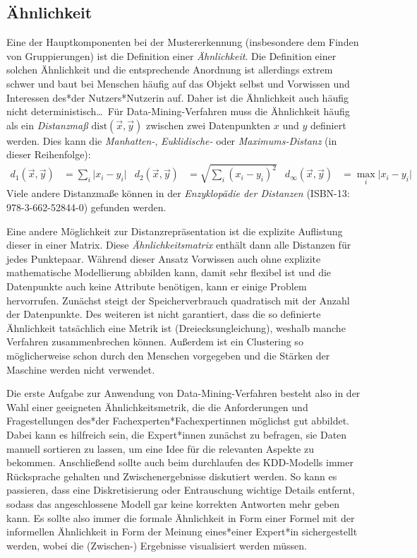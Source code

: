 		\subsection{Ähnlichkeit}
			Eine der Hauptkomponenten bei der Mustererkennung (insbesondere dem Finden von Gruppierungen) ist die Definition einer \emph{Ähnlichkeit}. Die Definition einer solchen Ähnlichkeit und die entsprechende Anordnung ist allerdings extrem schwer und baut bei Menschen häufig auf das Objekt selbst und Vorwissen und Interessen des*der Nutzers*Nutzerin auf. Daher ist die Ähnlichkeit auch häufig nicht deterministisch\dots~Für Data-Mining-Verfahren muss die Ähnlichkeit häufig als ein \emph{Distanzmaß} \( \mathrm{dist}(\vec{x}, \vec{y}) \) zwischen zwei Datenpunkten \(x\) und \(y\) definiert werden. Dies kann \zB die \emph{Manhatten-}, \emph{Euklidische-} oder \emph{Maximums-Distanz} (in dieser Reihenfolge):
			\begin{align}
				d_1(\vec{x}, \vec{y})      & = \sum_i \lvert x_i - y_i \rvert &
				d_2(\vec{x}, \vec{y})      & = \sqrt{\sum_i (x_i - y_i)^2}    &
				d_\infty(\vec{x}, \vec{y}) & = \max_i \lvert x_i - y_i \rvert
			\end{align}
			Viele andere Distanzmaße können in der \emph{Enzyklopädie der Distanzen} (ISBN-13: 978-3-662-52844-0) gefunden werden.

			Eine andere Möglichkeit zur Distanzrepräsentation ist die explizite Auflistung dieser in einer Matrix. Diese \emph{Ähnlichkeitsmatrix} enthält dann alle Distanzen für jedes Punktepaar. Während dieser Ansatz Vorwissen auch ohne explizite mathematische Modellierung abbilden kann, damit sehr flexibel ist und die Datenpunkte auch keine Attribute benötigen, kann er einige Problem hervorrufen. Zunächst steigt der Speicherverbrauch quadratisch mit der Anzahl der Datenpunkte. Des weiteren ist nicht garantiert, dass die so definierte Ähnlichkeit tatsächlich eine Metrik ist (Dreiecksungleichung), weshalb manche Verfahren zusammenbrechen können. Außerdem ist ein Clustering so möglicherweise schon durch den Menschen vorgegeben und die Stärken der Maschine werden nicht verwendet.

			Die erste Aufgabe zur Anwendung von Data-Mining-Verfahren besteht also in der Wahl einer geeigneten Ähnlichkeitsmetrik, die die Anforderungen und Fragestellungen des*der Fachexperten*Fachexpertinnen möglichst gut abbildet. Dabei kann es hilfreich sein, die Expert*innen zunächst zu befragen, \bzw sie Daten manuell sortieren zu lassen, um eine Idee für die relevanten Aspekte zu bekommen. Anschließend sollte auch beim durchlaufen des KDD-Modells immer Rücksprache gehalten und Zwischenergebnisse diskutiert werden. So kann es \bspw passieren, dass eine Diskretisierung oder Entrauschung wichtige Details entfernt, sodass das angeschlossene Modell gar keine korrekten Antworten mehr geben kann. Es sollte also immer die formale Ähnlichkeit in Form einer Formel mit der informellen Ähnlichkeit in Form der Meinung eines*einer Expert*in sichergestellt werden, wobei die (Zwischen-) Ergebnisse visualisiert werden müssen.

